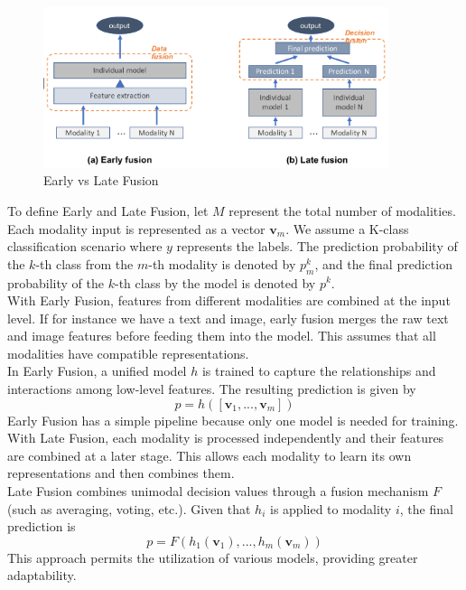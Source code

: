 \begin{figure}[ht]
    \centering
    \includegraphics[width=0.9\textwidth]{Grad Assignment/Images/EarlyVsLate_fusion.png}
    \caption{Early vs Late Fusion \citep{kim2021multimodal} }
    \label{fig:earlyVsLate}
\end{figure}

To define Early and Late Fusion, let $M$ represent the total number of modalities. Each modality input is represented as a vector $\mathbf{v}_{m}$. We assume a K-class classification scenario where $y$ represents the labels. The prediction probability of the $k$-th class from the $m$-th modality is denoted by $p_{m}^{k}$, and the final prediction probability of the $k$-th class by the model is denoted by $p^{k}$. \citep{liu2018learn}\\

\newpage
With Early Fusion, features from different modalities are combined at the input level. If for instance we have a text and image, early fusion merges the raw text and image features before feeding them into the model. This assumes that all modalities have compatible representations.\\

In Early Fusion, a unified model $h$ is trained to capture the relationships and interactions among low-level features. The resulting prediction is given by 
\[
p = h([\mathbf{v}_{1}, ..., \mathbf{v}_{m}])
\]
Early Fusion has a simple pipeline because only one model is needed for training.\\

With Late Fusion, each modality is processed independently and their features are combined at a later stage. This allows each modality to learn its own representations and then combines them.\\
Late Fusion combines unimodal decision values through a fusion mechanism $F$ (such as averaging, voting, etc.). Given that $h_{i}$ is applied to modality $i$, the final prediction is
\[
p = F\left( h_{1}(\mathbf{v}_{1}), ..., h_{m}(\mathbf{v}_{m})\right)
\]
This approach permits the utilization of various models, providing greater adaptability.
\\

